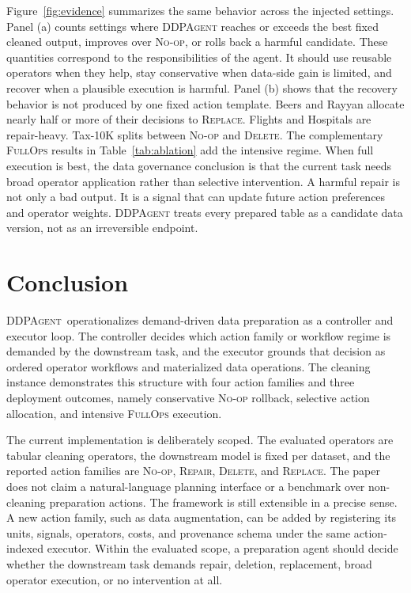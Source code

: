 \documentclass[sigconf, nonacm]{acmart}
\newcommand{\sys}{\textsc{DDPAgent}\xspace}
\newcommand{\noop}{\textsc{No-op}\xspace}
\newcommand{\repair}{\textsc{Repair}\xspace}
\newcommand{\deleteop}{\textsc{Delete}\xspace}
\newcommand{\replaceop}{\textsc{Replace}\xspace}
\newcommand{\fullops}{\textsc{FullOps}\xspace}
\begin{document}
Figure~\ref{fig:evidence} summarizes the same behavior across the injected settings. Panel (a) counts settings where \sys reaches or exceeds the best fixed cleaned output, improves over \noop, or rolls back a harmful candidate. These quantities correspond to the responsibilities of the agent. It should use reusable operators when they help, stay conservative when data-side gain is limited, and recover when a plausible execution is harmful. Panel (b) shows that the recovery behavior is not produced by one fixed action template. Beers and Rayyan allocate nearly half or more of their decisions to \replaceop. Flights and Hospitals are repair-heavy. Tax-10K splits between \noop and \deleteop. The complementary \fullops results in Table~\ref{tab:ablation} add the intensive regime. When full execution is best, the data governance conclusion is that the current task needs broad operator application rather than selective intervention. A harmful repair is not only a bad output. It is a signal that can update future action preferences and operator weights. \sys treats every prepared table as a candidate data version, not as an irreversible endpoint.

\section{Conclusion}

\sys\ operationalizes demand-driven data preparation as a controller and executor loop. The controller decides which action family or workflow regime is demanded by the downstream task, and the executor grounds that decision as ordered operator workflows and materialized data operations. The cleaning instance demonstrates this structure with four action families and three deployment outcomes, namely conservative \noop rollback, selective action allocation, and intensive \fullops execution.

The current implementation is deliberately scoped. The evaluated operators are tabular cleaning operators, the downstream model is fixed per dataset, and the reported action families are \noop, \repair, \deleteop, and \replaceop. The paper does not claim a natural-language planning interface or a benchmark over non-cleaning preparation actions. The framework is still extensible in a precise sense. A new action family, such as data augmentation, can be added by registering its units, signals, operators, costs, and provenance schema under the same action-indexed executor. Within the evaluated scope, a preparation agent should decide whether the downstream task demands repair, deletion, replacement, broad operator execution, or no intervention at all.
\end{document}
